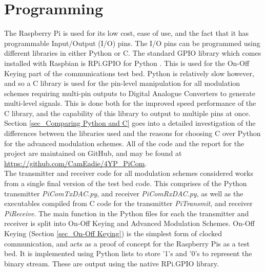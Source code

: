 \documentclass[../main.tex]{subfiles}
\begin{document}
\clearpage


\section{Programming}

The Raspberry Pi is used for its low cost, ease of use, and the fact that it has programmable Input/Output (I/O) pins.
The I/O pins can be programmed using different libraries in either Python or C.
The standard GPIO library which comes installed with Raspbian is RPi.GPIO for Python \cite{lib_RPi.GPIO}.
This is used for the On-Off Keying part of the communications test bed.
Python is relatively slow however, and so a C library is used for the pin-level manipulation for all modulation schemes requiring multi-pin outputs to Digital Analogue Converters to generate multi-level signals.
This is done both for the improved speed performance of the C library, and the capability of this library to output to multiple pins at once.
Section \ref{sec_Comparing Python and C} goes into a detailed  investigation of the differences between the libraries used and the reasons for choosing C over Python for the advanced modulation schemes.
All of the code and the report for the project are maintained on GitHub, and may be found at \url{https://github.com/CamEadie/4YP_PiCom}.\\

The transmitter and receiver code for all modulation schemes considered works from a single final version of the test bed code.
This comprises of the Python transmitter \textit{PiComTx\textunderscore DAC.py}, and receiver \textit{PiComRx\textunderscore DAC.py}, as well as the executables compiled from C code for the transmitter \textit{PiTransmit}, and receiver \textit{PiReceive}.
The main function in the Python files for each the transmitter and receiver is split into On-Off Keying and Advanced Modulation Schemes.
On-Off Keying (Section \ref{sec_On-Off Keying}) is the simplest form of clocked communication, and acts as a proof of concept for the Raspberry Pis as a test bed.
It is implemented using Python lists to store '1's and '0's to represent the binary stream.
These are output using the native RPi.GPIO library.\\
\end{document}

